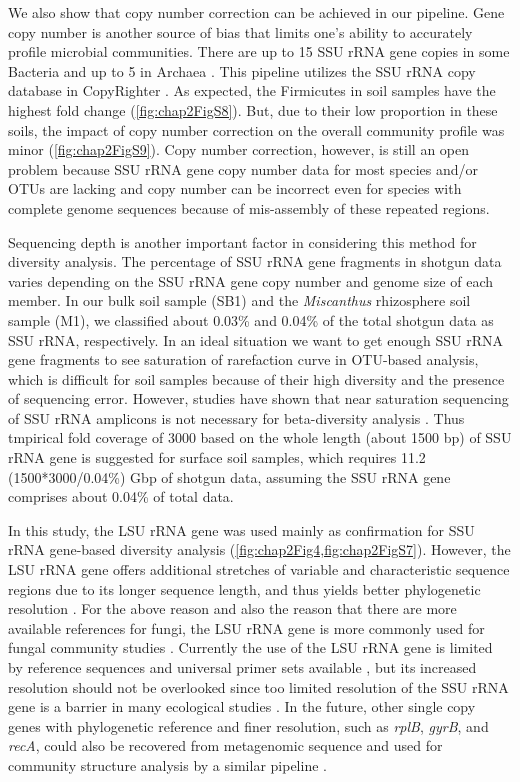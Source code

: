 \documentclass[]{msu-thesis}
\begin{document}
We also show that copy number correction can be achieved in our pipeline. Gene copy number is another source of bias that limits one’s ability to accurately profile microbial communities. There are up to 15 SSU rRNA gene copies in some Bacteria and up to 5 in Archaea \cite{acinas_divergence_2004}. This pipeline utilizes the SSU rRNA copy database in CopyRighter \cite{angly_copyrighter:_2014}. As expected, the Firmicutes in soil samples have the highest fold change (\cref{fig:chap2FigS8}). But, due to their low proportion in these soils, the impact of copy number correction on the overall community profile was minor (\cref{fig:chap2FigS9}). Copy number correction, however, is still an open problem because SSU rRNA gene copy number data for most species and/or OTUs are lacking and copy number can be incorrect even for species with complete genome sequences because of mis-assembly of these repeated regions. 

Sequencing depth is another important factor in considering this method for diversity analysis. The percentage of SSU rRNA gene fragments in shotgun data varies depending on the SSU rRNA gene copy number and genome size of each member. In our bulk soil sample (SB1) and the \textit{Miscanthus} rhizosphere soil sample (M1), we classified about 0.03\% and 0.04\% of the total shotgun data as SSU rRNA, respectively. In an ideal situation we want to get enough SSU rRNA gene fragments to see saturation of rarefaction curve in OTU-based analysis, which is difficult for soil samples because of their high diversity and the presence of sequencing error. However, studies have shown that near saturation sequencing of SSU rRNA amplicons is not necessary for beta-diversity analysis \cite{caporaso_ultra-high-throughput_2012,kuczynski_microbial_2010}. Thus tmpirical fold coverage of 3000 based on the whole length (about 1500 bp) of SSU rRNA gene is suggested for surface soil samples, which requires 11.2 (1500*3000/0.04\%) Gbp of shotgun data, assuming the SSU rRNA gene comprises about 0.04\% of total data.

In this study, the LSU rRNA gene was used mainly as confirmation for SSU
rRNA gene-based diversity analysis
(\cref{fig:chap2Fig4,fig:chap2FigS7}). However, the LSU rRNA gene offers
additional stretches of variable and characteristic sequence regions due
to its longer sequence length, and thus yields better phylogenetic
resolution \cite{hunt_evaluation_2006}. For the above reason and also
the reason that there are more available references for fungi, the LSU
rRNA gene is more commonly used for fungal community studies
\cite{mummey_evaluation_2007,liu_accurate_2012,porter_factors_2012,begerow_current_2010}.
Currently the use of the LSU rRNA gene is limited by reference sequences
and universal primer sets available \cite{hunt_evaluation_2006}, but its
increased resolution should not be overlooked since too limited
resolution of the SSU rRNA gene is a barrier in many ecological studies
\cite{lindahl_fungal_2013}. In the future, other single copy genes with
phylogenetic reference and finer resolution, such as \textit{rplB},
\textit{gyrB}, and \textit{recA}, could also be recovered from metagenomic sequence and used for community structure analysis by a similar pipeline \cite{roux_comparison_2011}.
\end{document}
